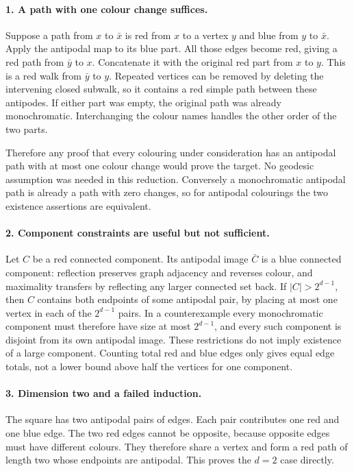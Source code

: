\documentclass[11pt,a4paper]{article}
\begin{document}
\paragraph{1. A path with one colour change suffices.}
Suppose a path from $x$ to $\bar x$ is red from $x$ to a vertex $y$
and blue from $y$ to $\bar x$. Apply the antipodal map to its blue
part. All those edges become red, giving a red path from $\bar y$
to $x$. Concatenate it with the original red part from $x$ to $y$.
This is a red walk from $\bar y$ to $y$. Repeated vertices can be
removed by deleting the intervening closed subwalk, so it contains
a red simple path between these antipodes. If either part was empty,
the original path was already monochromatic. Interchanging the colour
names handles the other order of the two parts.

Therefore any proof that every colouring under consideration has an
antipodal path with at most one colour change would prove the target.
No geodesic assumption was needed in this reduction. Conversely a
monochromatic antipodal path is already a path with zero changes, so
for antipodal colourings the two existence assertions are equivalent.

\paragraph{2. Component constraints are useful but not sufficient.}
Let $C$ be a red connected component. Its antipodal image $\bar C$
is a blue connected component: reflection preserves graph adjacency
and reverses colour, and maximality transfers by reflecting any larger
connected set back. If $|C|>2^{d-1}$, then $C$ contains both endpoints
of some antipodal pair, by placing at most one vertex in each of the
$2^{d-1}$ pairs. In a counterexample every monochromatic component
must therefore have size at most $2^{d-1}$, and every such component
is disjoint from its own antipodal image. These restrictions do not
imply existence of a large component. Counting total red and blue
edges only gives equal edge totals, not a lower bound above half the
vertices for one component.

\paragraph{3. Dimension two and a failed induction.}
The square has two antipodal pairs of edges. Each pair contributes
one red and one blue edge. The two red edges cannot be opposite,
because opposite edges must have different colours. They therefore
share a vertex and form a red path of length two whose endpoints
are antipodal. This proves the $d=2$ case directly.
\end{document}
